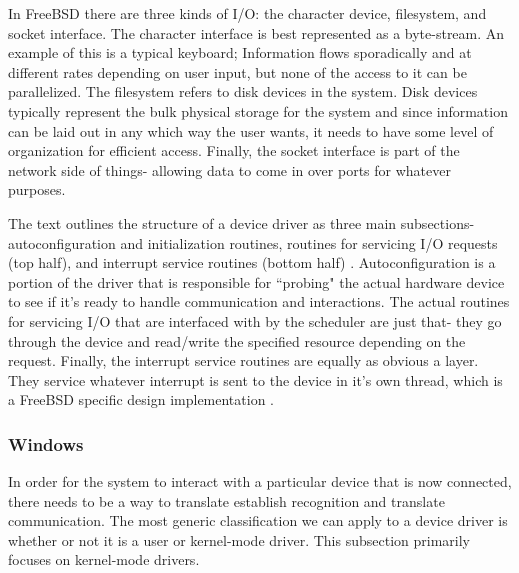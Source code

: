 \par In FreeBSD there are three kinds of I/O: the character device, filesystem, and socket interface.
The character interface is best represented as a byte-stream.
An example of this is a typical keyboard; Information flows sporadically and at different rates depending on user input, but none of the access to it can be parallelized.
The filesystem refers to disk devices in the system.
Disk devices typically represent the bulk physical storage for the system and since information can be laid out in any which way the user wants, it needs to have some level of organization for efficient access.
Finally, the socket interface is part of the network side of things- allowing data to come in over ports for whatever purposes.

\par The text outlines the structure of a device driver as three main subsections- autoconfiguration and initialization routines, routines for servicing I/O requests (top half), and interrupt service routines (bottom half) \cite{bsd:1}.
Autoconfiguration is a portion of the driver that is responsible for ``probing" the actual hardware device to see if it's ready to handle communication and interactions.
The actual routines for servicing I/O that are interfaced with by the scheduler are just that- they go through the device and read/write the specified resource depending on the request.
Finally, the interrupt service routines are equally as obvious a layer.
They service whatever interrupt is sent to the device in it's own thread, which is a FreeBSD specific design implementation \cite{bsd:1}.

\subsubsection{Windows}
\label{sub:Devices Windows}
\par In order for the system to interact with a particular device that is now connected, there needs to be a way to translate establish recognition and translate communication.
The most generic classification we can apply to a device driver is whether or not it is a user or kernel-mode driver.
This subsection primarily focuses on kernel-mode drivers.

